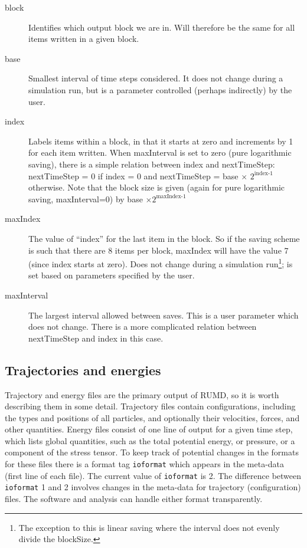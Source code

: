 \documentclass[a4paper]{article}
\begin{document}
\begin{description}
\item[block] Identifies which output block we are in. Will therefore be the same
for all items written in a given block.
\item[base] Smallest interval of time steps considered. It does not change 
during a simulation run, but is a parameter controlled (perhaps indirectly)
by the user.
\item[index] Labels items within a block, in that it starts at zero and 
increments by 1 for each item written. When maxInterval is set to zero
(pure logarithmic saving), there is a simple relation between index and 
nextTimeStep: nextTimeStep = 0 if index = 0 and nextTimeStep = 
base $\times$ $2^{\textrm{index-1}}$ otherwise. Note that the block size is given
(again for pure logarithmic saving, maxInterval=0) by base 
$\times 2^{\textrm{maxIndex-1}}$ 
\item[maxIndex] The value of ``index'' for the last item in the block. So if
the saving scheme is such that there are 8 items per block, maxIndex will have
the value 7 (since index starts at zero). Does not change during a simulation
run\footnote{The exception to this is linear saving where the interval does not evenly divide the blockSize.}; is set based on parameters specified by the user.
\item[maxInterval] The largest interval allowed between saves. This is a user
parameter which does not change. There is a more complicated 
relation between nextTimeStep and index in this case.
\end{description}


\subsection{Trajectories and energies}

Trajectory and energy files are the primary output of RUMD, so it is worth 
describing them in some detail. Trajectory files contain configurations, 
including the types and positions of all particles, and optionally their 
velocities, forces, and other quantities. Energy files consist of one line of
output for a given time step, which lists global quantities, such as the total
potential energy, or pressure, or a component of the stress tensor.
To keep track of potential changes in the 
formats for these files there is a format tag \verb|ioformat| which appears
in the meta-data (first line of each file). The current value of \verb|ioformat|
is 2. The difference between \verb|ioformat| 1 and 2 involves changes in the
meta-data for trajectory (configuration) files. The software and analysis can
handle either format transparently. 
\end{document}
